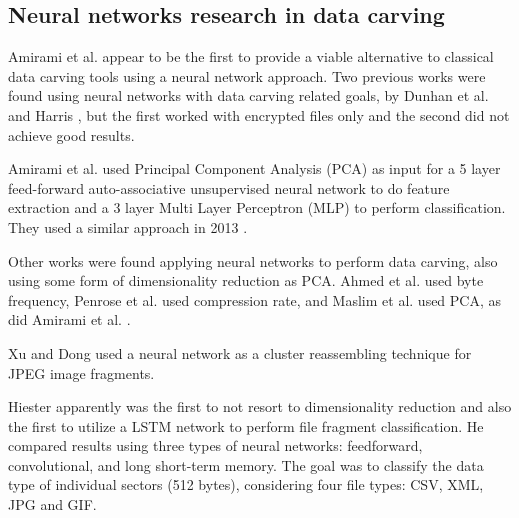 \subsection{Neural networks research in data carving}

Amirami et al.  \cite{amirani_new_2008} appear to be the first 
to provide a viable alternative to classical data carving tools using a neural network approach. Two previous works were found using neural networks with data carving related goals, by Dunhan et al. \cite{dunham_classifying_2005} and Harris \cite{harris_using_2007}, but the first worked with encrypted files only and the second did not achieve good results.

Amirami et al.  \cite{amirani_new_2008} used Principal Component Analysis (PCA) as input for a 5 layer feed-forward auto-associative unsupervised neural network to do feature extraction and a 3 layer Multi Layer Perceptron (MLP) to perform classification. They used a similar approach in 2013 \cite{amirani_feature-based_2013}.

Other works were found applying neural networks to perform data carving, also using some form of dimensionality reduction as PCA. Ahmed et al. \cite{ahmed_content-based_2010}\cite{ahmed_fast_2011} used byte frequency, 
Penrose et al. \cite{penrose_approaches_2013} used compression rate,
and Maslim et al. \cite{maslim_distributed_2014} used PCA, as did Amirami et al.  \cite{amirani_new_2008}.

Xu and Dong \cite{xu_reassembling_2009} used a neural network as a cluster reassembling technique for JPEG image fragments.

Hiester \cite{hiester_file_2018} apparently was the first to not resort to dimensionality reduction and also the first to utilize a LSTM network to perform file fragment classification. He compared results using three types of neural networks: feedforward, convolutional, and long short-term memory. The goal was to classify the data type of individual sectors (512 bytes), considering four file types: CSV, XML, JPG and GIF.

% 